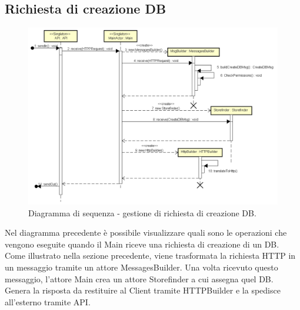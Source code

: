 \documentclass[a4paper]{article}
\begin{document}
        \subsection{Richiesta di creazione DB}
            \begin{figure} [H]
				\centering
				\includegraphics[width=\textwidth]{ST/seq/GestioneDB.png}
				\caption{Diagramma di sequenza - gestione di richiesta di creazione DB.}
			\end{figure}
            Nel diagramma precedente è possibile visualizzare quali sono le operazioni che vengono eseguite quando il Main riceve una richiesta di creazione di un DB.
            Come illustrato nella sezione precedente, viene trasformata la richiesta HTTP in un messaggio tramite un attore MessagesBuilder. Una volta ricevuto questo 
            messaggio, l'attore Main crea un attore Storefinder a cui assegna quel DB. Genera la risposta da restituire al Client tramite HTTPBuilder e la spedisce 
            all'esterno tramite API.
            
\end{document}
